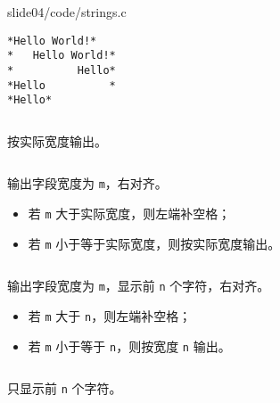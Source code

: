 \begin{frame}[fragile]
  
  {slide04/code/strings.c}    \pause 

\begin{lstlisting}[showspaces=true,basicstyle=\ttfamily\small]
*Hello World!*
*   Hello World!*
*          Hello*
*Hello          *
*Hello*
\end{lstlisting}

\end{frame}
\begin{frame}[fragile]
\begin{lstlisting}[backgroundcolor=\color{red!20}]
%s 
\end{lstlisting}
按实际宽度输出。\pause 

\begin{lstlisting}[backgroundcolor=\color{red!20}]
%ms 
\end{lstlisting}
输出字段宽度为 \lstinline|m|，右对齐。
\begin{itemize}
\item 若 \lstinline|m| 大于实际宽度，则左端补空格；
\item 若 \lstinline|m| 小于等于实际宽度，则按实际宽度输出。
\end{itemize} \pause 

\begin{lstlisting}[backgroundcolor=\color{red!20}]
%m.ns 
\end{lstlisting}
输出字段宽度为 \lstinline|m|，显示前 \lstinline|n| 个字符，右对齐。
\begin{itemize}
\item 若 \lstinline|m| 大于 \lstinline|n|，则左端补空格；
\item 若 \lstinline|m| 小于等于 \lstinline|n|，则按宽度 \lstinline|n| 输出。
\end{itemize}\pause

\begin{lstlisting}[backgroundcolor=\color{red!20}] 
%.ns
\end{lstlisting}
只显示前 \lstinline|n| 个字符。
\end{frame}

